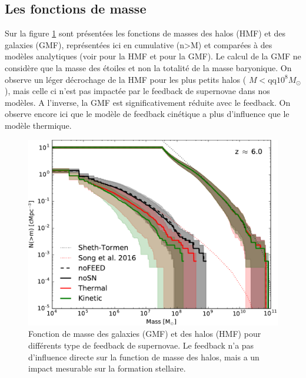 \subsection{Les fonctions de masse}
\label{sec:hmf}

Sur la figure \ref{fig:ghmf} sont présentées les fonctions de masses des halos (\ac{HMF}) et des galaxies (\ac{GMF}), représentées ici en cumulative (n>M) et comparées à des modèles analytiques (voir \cite{1999MNRAS.308..119S} pour la \ac{HMF} et \cite{song_evolution_2015} pour la \ac{GMF}).
Le calcul de la \ac{GMF} ne considère que la masse des étoiles et non la totalité de la masse baryonique.
On observe un léger décrochage de la \ac{HMF} pour les plus petits halos ( $M< \mathrm{qq} 10^8 M_\odot$), mais celle ci n'est pas impactée par le feedback de supernovae dans nos modèles.
A l'inverse, la \ac{GMF} est significativement réduite avec le feedback.
On observe encore ici que le modèle de feedback cinétique a plus d'influence que le modèle thermique.

\begin{figure}
		\includegraphics[width=.95\linewidth]{img/03/ghmf.pdf}
        \caption[Fonctions de masses G/HMF]{Fonction de masse des galaxies (\ac{GMF}) et des halos (\ac{HMF}) pour différents type de feedback de supernovae.
        Le feedback n'a pas d'influence directe sur la function de masse des halos, mais a un impact mesurable sur la formation stellaire.
 		\label{fig:ghmf}}
\end{figure}



